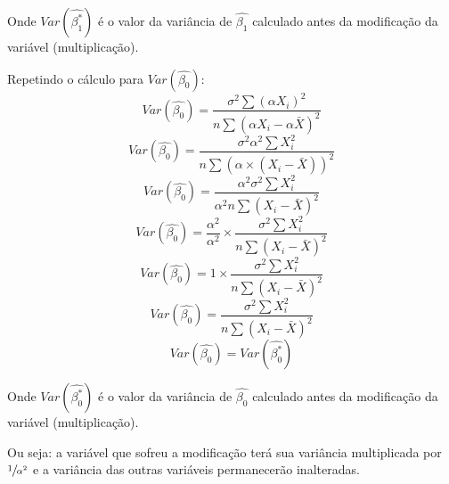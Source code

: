 \documentclass[12pt,a4paper,titlepage=false]{scrartcl}
\begin{document}
Onde \(Var(\hat{\beta_{1}^{\ast}})\) é o valor da variância de \(\hat{\beta_{1}}\) calculado antes da modificação da variável (multiplicação).

Repetindo o cálculo para \(Var(\hat{\beta_{0}})\):
\[Var(\hat{\beta_{0}}) = \frac{\sigma^{2}\sum{(\alpha X_{i})^{2}}}{n\sum{(\alpha X_{i} - \alpha\bar{X})^{2}}}\]
\[Var(\hat{\beta_{0}}) = \frac{\sigma^{2}\alpha^{2}\sum{X_{i}^{2}}}{n\sum{(\alpha \times (X_{i} - \bar{X}))^{2}}}\]
\[Var(\hat{\beta_{0}}) = \frac{\alpha^{2}\sigma^{2}\sum{X_{i}^{2}}}{\alpha^{2}n\sum{(X_{i} - \bar{X})^{2}}}\]
\[Var(\hat{\beta_{0}}) = \frac{\alpha^{2}}{\alpha^{2}} \times \frac{\sigma^{2}\sum{X_{i}^{2}}}{n\sum{(X_{i} - \bar{X})^{2}}}\]
\[Var(\hat{\beta_{0}}) = 1 \times \frac{\sigma^{2}\sum{X_{i}^{2}}}{n\sum{(X_{i} - \bar{X})^{2}}}\]
\[Var(\hat{\beta_{0}}) = \frac{\sigma^{2}\sum{X_{i}^{2}}}{n\sum{(X_{i} - \bar{X})^{2}}}\]
\[Var(\hat{\beta_{0}}) = Var(\hat{\beta_{0}^{\ast}})\]

Onde \(Var(\hat{\beta_{0}^{\ast}})\) é o valor da variância de \(\hat{\beta_{0}}\) calculado antes da modificação da variável (multiplicação).

Ou seja: a variável que sofreu a modificação terá sua variância multiplicada por \(\sfrac{1}{\alpha^{2}}\) e a variância das outras variáveis permanecerão inalteradas.
\end{document}
